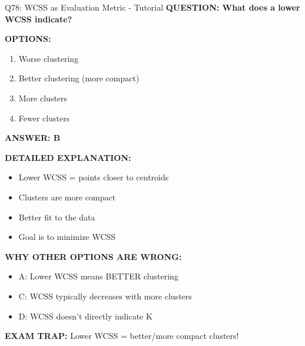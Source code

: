 \documentclass[8pt]{beamer}
\begin{document}
	\begin{frame}{Q78: WCSS as Evaluation Metric - Tutorial}
		\fontsize{6.5}{7.5}\selectfont
		\textbf{QUESTION: What does a lower WCSS indicate?}
		
		\vspace{0.1cm}
		\textbf{OPTIONS:}
		\begin{enumerate}
			\item Worse clustering
			\item Better clustering (more compact)
			\item More clusters
			\item Fewer clusters
		\end{enumerate}
		
		\vspace{0.1cm}
		\textcolor{myblue}{\textbf{ANSWER: B}}
		
		\vspace{0.1cm}
		\textbf{DETAILED EXPLANATION:}
		\begin{itemize}
			\item Lower WCSS = points closer to centroids
			\item Clusters are more compact
			\item Better fit to the data
			\item Goal is to minimize WCSS
		\end{itemize}
		
		\vspace{0.1cm}
		\textcolor{myred}{\textbf{WHY OTHER OPTIONS ARE WRONG:}}
		\begin{itemize}
			\item \textcolor{myred}{A:} Lower WCSS means BETTER clustering
			\item \textcolor{myred}{C:} WCSS typically decreases with more clusters
			\item \textcolor{myred}{D:} WCSS doesn't directly indicate K
		\end{itemize}
		
		\textcolor{myred}{\textbf{EXAM TRAP:}} Lower WCSS = \textcolor{myblue}{better/more compact clusters}!
	\end{frame}
	
\end{document}
